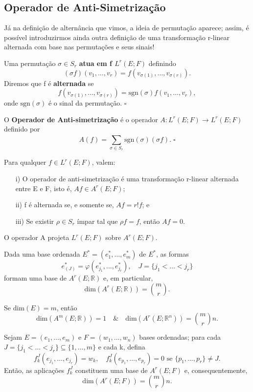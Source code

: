 \documentclass[../differential_forms.tex]{subfiles}
\begin{document}
\subsection{Operador de Anti-Simetrização}
Já na definição de alternância que vimos, a ideia de permutação aparece; assim, é possível introduzirmos ainda outra definição de
uma transformação r-linear alternada com base nas permutações e seus sinais!
\begin{def*}
	Uma permutação \(\sigma \in S_r\) \textbf{atua em f \(L^{r}(E; F)\)} definindo
	\[
		(\sigma f)(v_1,\dotsc ,v_r) = f(v_{\sigma (1)}, \dotsc , v_{\sigma (r)}).
	\]
	Diremos que f é \textbf{alternada} se
	\[
		f(v_{\sigma (1)},\dotsc , v_{\sigma (r)})= \mathrm{sgn}(\sigma )f(v_1,\dotsc ,v_r),
	\]
	onde \(\mathrm{sgn}(\sigma )\) é o sinal da permutação. \(\square\)
\end{def*}
\begin{def*}
	O \textbf{Operador de Anti-simetrização} é o operador \(A:L^{r}(E; F)\rightarrow L^{r}(E; F)\) definido por
	\[
		A(f)= \sum\limits_{\sigma \in S_r}^{} \mathrm{sgn}(\sigma )(\sigma f). \; \square
	\]
\end{def*}
\begin{prop*}
	Para qualquer \(f\in L^{r}(E; F)\), valem:
	\begin{itemize}
		\item[i)] O operador de anti-simetrização é uma transformação r-linear alternada entre E e F, isto é, \(Af\in A^{r}(E; F)\);
		\item[ii)] f é alternada se, e somente se, \(Af=r!f\); e
		\item[iii)] Se existir \(\rho \in S_r\) ímpar tal que \(\rho f = f\), então \(Af=0\).
	\end{itemize}
\end{prop*}
\begin{crl*}
	O operador A projeta \(L^{r}(E; F)\) sobre \(A^{r}(E; F)\).
\end{crl*}
\begin{prop*}
	Dada uma base ordenada \(E^{*}=(e_{1}^{*}, \dotsc , e_{m}^{*})\) de \(E^{*}\), as formas
	\[
		e_{(J)}^{*}=\varphi (e_{j_1}^{*}, \dotsc , e_{j_r}^{*}), \quad J = \{j_1<\dotsc <j_r\}
	\]
	formam uma base de \(A^{r}(E; \mathbb{R})\) e, em particular,
	\[
		\mathrm{dim}(A^{r}(E; \mathbb{R}))= \binom{m}{r}.
	\]
\end{prop*}
\begin{crl*}
	Se \(\mathrm{dim}(E) = m\), então
	\[
		\mathrm{dim}(A^{m}(E; \mathbb{R}))=1 \quad\&\quad \mathrm{dim}(A^{r}(E; \mathbb{R}^{n}))= \binom{m}{r}n.
	\]
\end{crl*}
\begin{prop*}
	Sejam \(E=(e_1,\dotsc ,e_{m})\) e \(F=(w_1,\dotsc ,w_{n})\) bases ordenadas; para cada \(J=\{j_1<\dotsc <j_r\}\subseteq \{1,\dotsc ,m\}\) e cada k, defina
	\[
		f_{k}^{J}(e_{j_1}, \dotsc , e_{j_r}) = w_{k}, \quad f_{k}^{J}(e_{p_1}, \dotsc , e_{p_r})=0 \text{ se }\{p_1,\dotsc , p_r\}\neq J.
	\]
	Então, as aplicações \(f_{k}^{J}\) constituem uma base de \(A^{r}(E; F)\) e, consequentemente,
	\[
		\mathrm{dim}(A^{r}(E; F))=\binom{m}{r}n.
	\]
\end{prop*}
\end{document}
